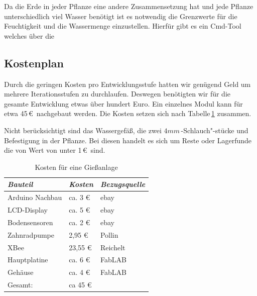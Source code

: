 	
	Da die Erde in jeder Pflanze eine andere Zusammensetzung hat und jede Pflanze unterschiedlich viel Wasser benötigt ist es notwendig die Grenzwerte für die Feuchtigkeit und die Wassermenge einzustellen. 
	Hierfür gibt es ein Cmd-Tool welches über die 
	

	
	
\subsection{Kostenplan}
 Durch die geringen Kosten pro Entwicklungsstufe hatten wir genügend Geld um mehrere Iterationsstufen  zu durchlaufen.
 Deswegen benötigten wir für die gesamte Entwicklung etwas über hundert Euro.
 Ein einzelnes Modul kann für etwa 45\,\euro\ nachgebaut werden. 
 Die Kosten setzen sich nach Tabelle\,\ref{Kosten für eine Giessanlage} zusammen.
 
 Nicht berücksichtigt sind das Wassergefäß, die zwei \begin{math}4mm\end{math}\,-Schlauch"-stücke und Befestigung in der Pflanze.
 Bei diesen handelt es sich um Reste oder Lagerfunde die von Wert von unter 1\,\euro\ sind. 
 
\begin{table}[h]
	\centering
	\onehalfspacing
	\footnotesize
	\caption{Kosten für eine Gießanlage}
	\label{Kosten für eine Giessanlage}
		\begin{tabular}{|l|ll|}
			\hline
\textit{Bauteil} & \textit{Kosten} & \textit{Bezugsquelle} \\
\hline
Arduino Nachbau & ca. 3 \euro & ebay \\
LCD-Display & ca. 5 \euro & ebay\\
Bodensensoren & ca. 2 \euro & ebay \\
Zahnradpumpe & 2,95 \euro & Pollin \\
XBee &  23,55 \euro & Reichelt \\
Hauptplatine & ca. 6 \euro & FabLAB \\
Gehäuse	& ca. 4 \euro & FabLAB \\

\hline
Gesamt: & ca 45 \euro & \\
\hline
\end{tabular}
\end{table}
